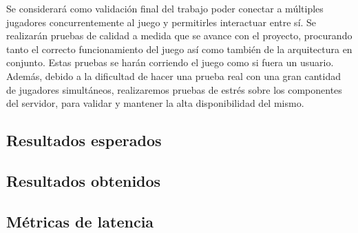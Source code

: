 
Se considerará como validación final del trabajo poder conectar a múltiples jugadores 
concurrentemente al juego y permitirles interactuar entre sí. Se realizarán pruebas de 
calidad a medida que se avance con el proyecto, procurando tanto el correcto funcionamiento 
del juego así como también de la arquitectura en conjunto. Estas pruebas se harán corriendo 
el juego como si fuera un usuario. Además, debido a la dificultad de hacer una prueba real 
con una gran cantidad de jugadores simultáneos, realizaremos pruebas de estrés sobre los 
componentes del servidor, para validar y mantener la alta disponibilidad del mismo.

\subsection{Resultados esperados}

\subsection{Resultados obtenidos}

\subsection{Métricas de latencia}